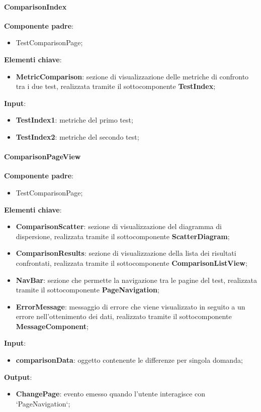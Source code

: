 \paragraph{ComparisonIndex} 
\textbf{Componente padre}:
\begin{itemize}
    \item TestComparisonPage;
\end{itemize} 
\textbf{Elementi chiave}:
\begin{itemize}
    \item \textbf{MetricComparison}: sezione di visualizzazione delle metriche di confronto tra i due test, realizzata tramite il sottocomponente \textbf{TestIndex};
\end{itemize}
\textbf{Input}:
\begin{itemize}
    \item \textbf{TestIndex1}: metriche del primo test;
    \item \textbf{TestIndex2}: metriche del secondo test;
\end{itemize}
\paragraph{ComparisonPageView}  
\textbf{Componente padre}:
\begin{itemize}
    \item TestComparisonPage;
\end{itemize}
\textbf{Elementi chiave}:
\begin{itemize}
    \item \textbf{ComparisonScatter}: sezione di visualizzazione del diagramma di dispersione, realizzata tramite il sottocomponente \textbf{ScatterDiagram};
     \item \textbf{ComparisonResults}: sezione di visualizzazione della lista dei risultati confrontati, realizzata tramite il sottocomponente \textbf{ComparisonListView};
    \item \textbf{NavBar}: sezione che permette la navigazione tra le pagine del test, realizzata tramite il sottocomponente \textbf{PageNavigation};
    \item \textbf{ErrorMessage}: messaggio di errore che viene visualizzato in seguito a un errore nell'ottenimento dei dati, realizzato tramite il sottocomponente \textbf{MessageComponent};
\end{itemize}
\textbf{Input}:
\begin{itemize}
    \item \textbf{comparisonData}: oggetto contenente le differenze per singola domanda;
\end{itemize}
\textbf{Output}:
\begin{itemize}
    \item \textbf{ChangePage}: evento emesso quando l'utente interagisce con `PageNavigation`;
\end{itemize}
